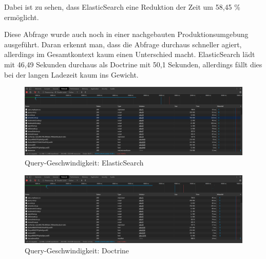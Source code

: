 Dabei ist zu sehen, dass ElasticSearch eine Reduktion der Zeit um 58,45 \% ermöglicht.

Diese Abfrage wurde auch noch in einer nachgebauten Produktionsumgebung ausgeführt. Daran erkennt man, dass die Abfrage durchaus schneller agiert, allerdings im Gesamtkontext kaum einen Unterschied macht. ElasticSearch lädt mit 46,49 Sekunden durchaus als Doctrine mit 50,1 Sekunden, allerdings fällt dies bei der langen Ladezeit kaum ins Gewicht.


\begin{figure}
	\centering
	\includegraphics[width=1\linewidth]{images/setup/query/time_prod_ela.png}
	\caption{Query-Geschwindigkeit: ElasticSearch}
	\label{img:timeProdEla}
\end{figure}

\begin{figure}
	\centering
	\includegraphics[width=1\linewidth]{images/setup/query/time_prod_db.png}
	\caption{Query-Geschwindigkeit: Doctrine}
	\label{img:timeProdDb}
\end{figure}

